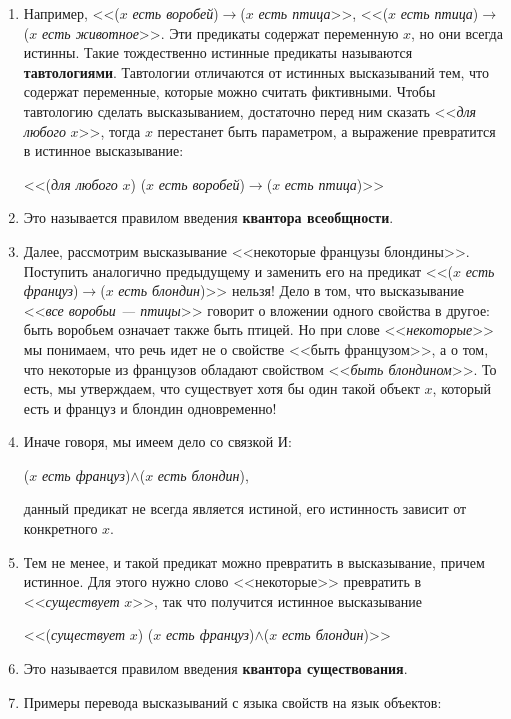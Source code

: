 \begin{enumerate}
\item Например, <<($x$ \textit{есть воробей})$\to$($x$ \textit{есть птица}>>, <<($x$ \textit{есть птица})$\to$($x$ \textit{есть животное}>>. Эти предикаты содержат переменную $x$, но они всегда истинны. Такие тождественно истинные предикаты называются \textbf{тавтологиями}. Тавтологии отличаются от истинных высказываний тем, что содержат переменные, которые можно считать фиктивными. Чтобы тавтологию сделать высказыванием, достаточно перед ним сказать <<\textit{для любого} $x$>>, тогда $x$ перестанет быть параметром, а выражение превратится в истинное высказывание:

\begin{center}
<<(\textit{для любого} $x$) ($x$ \textit{есть воробей})$\to$($x$ \textit{есть птица})>>
\end{center}
\item Это называется правилом введения \textbf{квантора всеобщности}.
\item Далее, рассмотрим высказывание <<некоторые французы блондины>>. Поступить аналогично предыдущему и заменить его на  предикат <<($x$ \textit{есть француз})$\to$($x$ \textit{есть блондин})>> нельзя! Дело в том, что высказывание <<\textit{все воробьи --- птицы}>> говорит о вложении одного свойства в другое: быть воробьем означает также быть птицей. Но при слове <<\textit{некоторые}>> мы понимаем, что речь идет не о свойстве <<быть французом>>, а о том, что некоторые из французов обладают свойством <<\textit{быть блондином}>>. То есть, мы утверждаем, что существует хотя бы один такой объект $x$, который есть и француз и блондин одновременно!
\item Иначе говоря, мы имеем дело со связкой И:
\begin{center}
($x$ \textit{есть француз})$\land$($x$ \textit{есть блондин}),
\end{center}
данный предикат не всегда является истиной, его истинность зависит от конкретного $x$.
\item Тем не менее, и такой предикат можно превратить в высказывание, причем истинное. Для этого нужно слово <<некоторые>> превратить в <<\textit{существует} $x$>>, так что получится истинное высказывание
\begin{center}
<<(\textit{существует} $x$) ($x$ \textit{есть француз})$\land$($x$ \textit{есть блондин})>>
\end{center}
\item Это называется правилом введения \textbf{квантора существования}.
\item Примеры перевода высказываний с языка свойств на язык объектов:\hfill\;


\end{enumerate}
